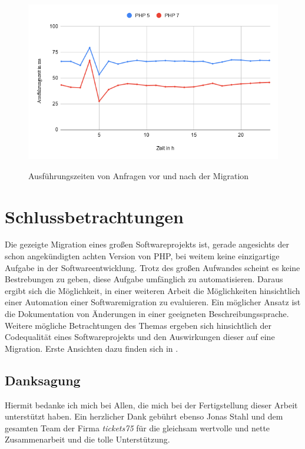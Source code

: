 \begin{figure}[bth]
    \myfloatalign
    {\includegraphics[width=1\linewidth]{gfx/chart}} \quad
    \caption[Ausführungszeiten von Anfragen vor und nach der Migration]{Ausführungszeiten von Anfragen vor und nach der Migration}\label{fig:time}
\end{figure}


\chapter{Schlussbetrachtungen}
Die gezeigte Migration eines großen Softwareprojekts ist, gerade angesichts der schon angekündigten achten Version von \acs{PHP}, 
bei weitem keine einzigartige Aufgabe in der Softwareentwicklung. Trotz des großen Aufwandes scheint es keine Bestrebungen 
zu geben, diese Aufgabe umfänglich zu automatisieren. Daraus ergibt sich die Möglichkeit, in einer weiteren Arbeit die 
Möglichkeiten hinsichtlich einer Automation einer Softwaremigration zu evaluieren. Ein möglicher Ansatz ist die Dokumentation 
von Änderungen in einer geeigneten Beschreibungssprache. Weitere mögliche Betrachtungen des Themas ergeben sich hinsichtlich 
der Codequalität eines Softwareprojekts und den Auswirkungen dieser auf eine Migration. Erste Ansichten dazu finden sich in \cite{martin_clean_2012}.

\section*{Danksagung}
Hiermit bedanke ich mich bei Allen, die mich bei der Fertigstellung dieser Arbeit unterstützt haben. 
Ein herzlicher Dank gebührt ebenso Jonas Stahl und dem gesamten Team der Firma \textit{tickets75} für die gleichsam wertvolle 
und nette Zusammenarbeit und die tolle Unterstützung.
 
